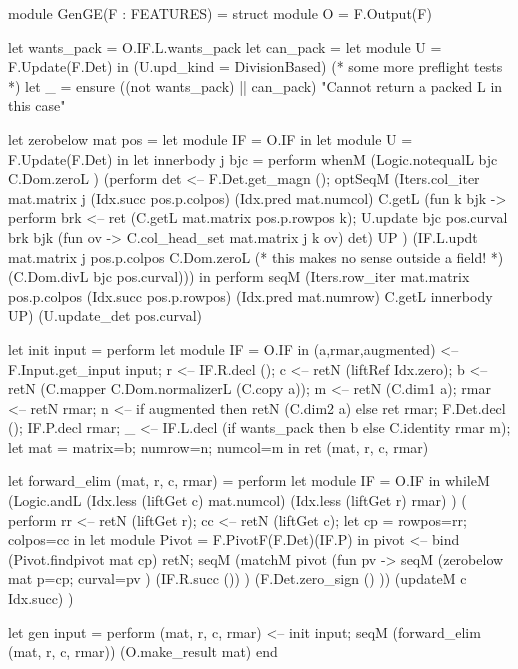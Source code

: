 \documentclass{elsart}
\begin{document}
\begin{code2}
module GenGE(F : FEATURES) = struct
  module O = F.Output(F)

  let wants_pack = O.IF.L.wants_pack
  let can_pack   = 
    let module U = F.Update(F.Det) in
    (U.upd_kind = DivisionBased)
  (* some more preflight tests *)
  let _ = ensure ((not wants_pack) || can_pack) 
         "Cannot return a packed L in this case"

  let zerobelow mat pos = 
    let module IF = O.IF in
    let module U = F.Update(F.Det) in
    let innerbody j bjc = perform
      whenM (Logic.notequalL bjc C.Dom.zeroL ) (perform
        det <-- F.Det.get_magn ();
        optSeqM (Iters.col_iter mat.matrix j (Idx.succ pos.p.colpos) 
         (Idx.pred mat.numcol) C.getL
              (fun k bjk -> perform
              brk <-- ret (C.getL mat.matrix pos.p.rowpos k);
              U.update bjc pos.curval brk bjk 
                (fun ov -> C.col_head_set mat.matrix j k ov) det) UP )
              (IF.L.updt mat.matrix j pos.p.colpos C.Dom.zeroL 
                (* this makes no sense outside a field! *)
                (C.Dom.divL bjc pos.curval))) in
      perform
        seqM (Iters.row_iter mat.matrix pos.p.colpos
               (Idx.succ pos.p.rowpos)
               (Idx.pred mat.numrow) C.getL innerbody UP)
             (U.update_det pos.curval)

 let init input = perform
    let module IF = O.IF in
      (a,rmar,augmented) <-- F.Input.get_input input;
      r <-- IF.R.decl ();
      c <-- retN (liftRef Idx.zero);
      b <-- retN (C.mapper C.Dom.normalizerL (C.copy a));
      m <-- retN (C.dim1 a);
      rmar <-- retN rmar;
      n <-- if augmented then retN (C.dim2 a) else ret rmar;
      F.Det.decl ();
      IF.P.decl rmar;
      _ <-- IF.L.decl (if wants_pack then b else C.identity rmar m);
      let mat = {matrix=b; numrow=n; numcol=m} in
      ret (mat, r, c, rmar)

 let forward_elim (mat, r, c, rmar) = perform
    let module IF = O.IF in
      whileM (Logic.andL (Idx.less (liftGet c) mat.numcol)
                          (Idx.less (liftGet r) rmar) )
       ( perform
       rr <-- retN (liftGet r);
       cc <-- retN (liftGet c);
       let cp  = {rowpos=rr; colpos=cc} in
       let module Pivot = F.PivotF(F.Det)(IF.P) in
       pivot <-- bind (Pivot.findpivot mat cp) retN;
       seqM (matchM pivot (fun pv -> 
              seqM (zerobelow mat {p=cp; curval=pv} )
                   (IF.R.succ ()) )
              (F.Det.zero_sign () ))
            (updateM c Idx.succ) )

 let gen input = perform
    (mat, r, c, rmar) <-- init input;
    seqM 
      (forward_elim (mat, r, c, rmar))
      (O.make_result mat)
end
\end{code2}
\end{document}
